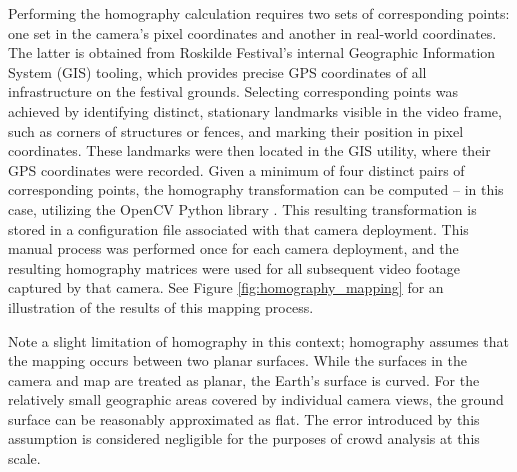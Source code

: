 Performing the homography calculation requires two sets of corresponding points: one set in the camera's pixel coordinates and another in real-world coordinates. The latter is obtained from Roskilde Festival's internal Geographic Information System (GIS) tooling, which provides precise GPS coordinates of all infrastructure on the festival grounds. Selecting corresponding points was achieved by identifying distinct, stationary landmarks visible in the video frame, such as corners of structures or fences, and marking their position in pixel coordinates. These landmarks were then located in the GIS utility, where their GPS coordinates were recorded. Given a minimum of four distinct pairs of corresponding points, the homography transformation can be computed -- in this case, utilizing the OpenCV Python library \cite{opencv}. This resulting transformation is stored in a configuration file associated with that camera deployment. This manual process was performed once for each camera deployment, and the resulting homography matrices were used for all subsequent video footage captured by that camera. See Figure \ref{fig:homography_mapping} for an illustration of the results of this mapping process.

Note a slight limitation of homography in this context; homography assumes that the mapping occurs between two planar surfaces. While the surfaces in the camera and map are treated as planar, the Earth's surface is curved. For the relatively small geographic areas covered by individual camera views, the ground surface can be reasonably approximated as flat. The error introduced by this assumption is considered negligible for the purposes of crowd analysis at this scale.

